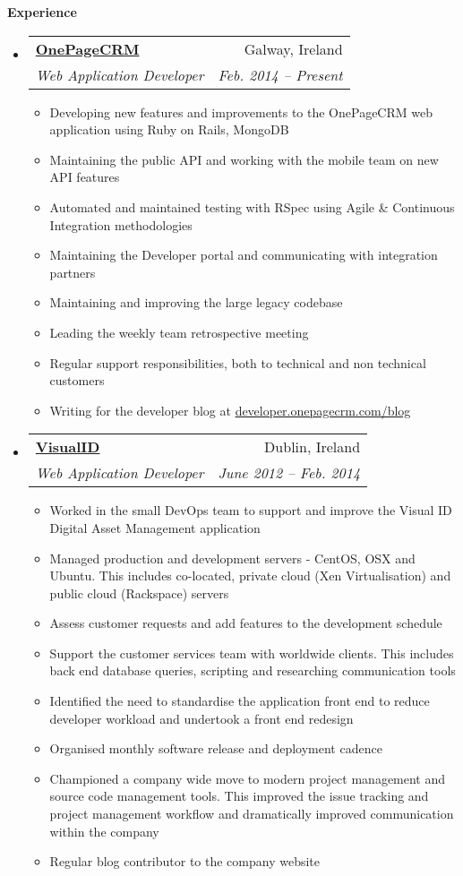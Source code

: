 \documentclass[letterpaper,11pt]{article}
\makeatletter
\newcommand{\resitem}[1]{\item #1 \vspace{-2pt}}
\newcommand{\resheading}[1]{{\large \colorbox{mygrey}{\begin{minipage}{\textwidth}{\textbf{#1 \vphantom{p\^{E}}}}\end{minipage}}}}
\newcommand{\ressubheading}[4]{
\begin{tabular*}{6.5in}{l@{\extracolsep{\fill}}r}
		\textbf{#1} & #2 \\
		\textit{#3} & \textit{#4} \\
\end{tabular*}\vspace{-6pt}}
\makeatother
\begin{document}
\resheading{Experience}
	\begin{itemize}
		\item 
			\ressubheading{\href{http://www.onepagecrm.com}{OnePageCRM}}{Galway, Ireland}
				{Web Application Developer}{Feb. 2014 -- Present}
				{ \footnotesize
				\begin{itemize}
					\resitem{Developing new features and improvements to the OnePageCRM web application using Ruby on Rails, MongoDB}
					\resitem{Maintaining the public API and working with the mobile team on new API features}
					\resitem{Automated and maintained testing with RSpec using Agile \& Continuous Integration methodologies}
					\resitem{Maintaining the Developer portal and communicating with integration partners}
					\resitem{Maintaining and improving the large legacy codebase}
					\resitem{Leading the weekly team retrospective meeting}
					\resitem{Regular support responsibilities, both to technical and non technical customers}
					\resitem{Writing for the developer blog at \href{http://developer.onepagecrm.com/blog}{developer.onepagecrm.com/blog}}
				\end{itemize}
				}

		  \item 
      \ressubheading{\href{http://visualid.com}{VisualID}}{Dublin, Ireland}{Web Application Developer}{June 2012 -- Feb. 2014}
        { \footnotesize
        \begin{itemize}
      		\resitem{Worked in the small DevOps team to support and improve the Visual ID Digital Asset Management application}
	        \resitem{Managed production and development servers - CentOS, OSX and Ubuntu. This includes co-located, private cloud (Xen Virtualisation) and public cloud (Rackspace) servers}
	        \resitem{Assess customer requests and add features to the development schedule}
	        \resitem{Support the customer services team with worldwide clients. This includes back end database queries, scripting and researching communication tools}
	        \resitem{Identified the need to standardise the application front end to reduce developer workload and undertook a front end redesign}
	        \resitem{Organised monthly software release and deployment cadence}
	        \resitem{Championed a company wide move to modern project management and source code management tools. This improved the issue tracking and project management workflow and dramatically improved communication within the company}
	        \resitem{Regular blog contributor to the company website}
        \end{itemize}
        }


\end{itemize}
\end{document}
